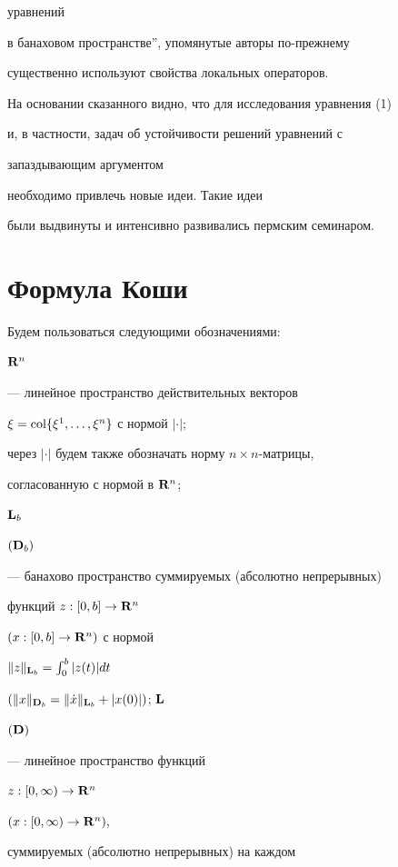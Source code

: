 уравнений


в банаховом пространстве'', упомянутые авторы по-прежнему


существенно используют свойства локальных операторов.





На основании сказанного видно, что для исследования уравнения (1)


и, в частности, задач об устойчивости решений уравнений с


запаздывающим аргументом


необходимо привлечь новые идеи. Такие идеи


были выдвинуты и интенсивно развивались пермским семинаром.





\section{Формула Коши}





Будем пользоваться следующими обозначениями:


$\bold R^n$


--- линейное пространство действительных векторов


$\xi =\operatorname{col}\{\xi^1,\dotsc,\xi^n\}$ с нормой $|\cdot|$;


через $|\cdot|$ будем также обозначать норму $n\times n$-матрицы,


согласованную с нормой в $\bold R^n$;


$\bold L_b$


$(\bold D_b)$


--- банахово пространство суммируемых (абсолютно непрерывных)


функций $z:[0,b]\to\bold R^n$


$(x:[0,b]\to\bold R^n)$ с нормой


$\|z\|_{\bold L_b} = \int_0^b |z(t)|dt$\,


$(\|x\|_{\bold D_b} = \|\Dot x \|_{\bold L_b} +


|x(0)|)$; $\spc L$


$(\bold D)$


--- линейное пространство функций


$z:[0,\infty)\to\bold R^n$


$(x:[0,\infty)\to\bold R^n),$


суммируемых (абсолютно непрерывных) на каждом


